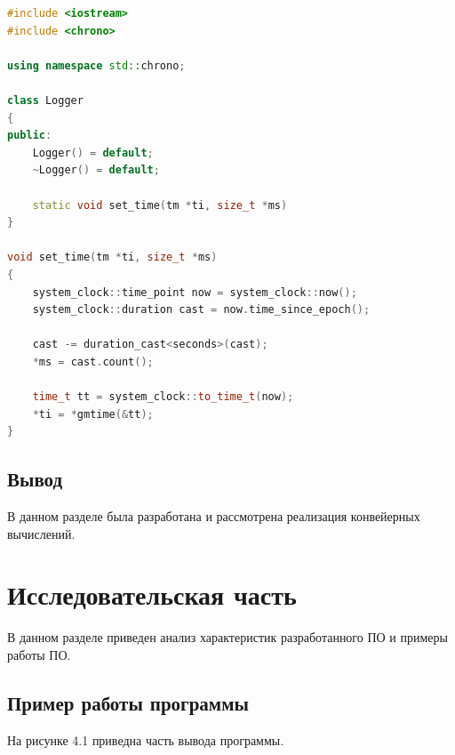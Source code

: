 \documentclass[12pt]{report}
\begin{document}
\begin{lstlisting}[label=some-code,caption=Реализация класса логирования, language=C++]
#include <iostream>
#include <chrono>

using namespace std::chrono;

class Logger 
{
public:
	Logger() = default;
	~Logger() = default;
	
	static void set_time(tm *ti, size_t *ms)
}

void set_time(tm *ti, size_t *ms)
{
    system_clock::time_point now = system_clock::now();
    system_clock::duration cast = now.time_since_epoch();

    cast -= duration_cast<seconds>(cast);
    *ms = cast.count();
    
    time_t tt = system_clock::to_time_t(now);
    *ti = *gmtime(&tt);
}
\end{lstlisting}


\section*{Вывод}

В данном разделе была разработана и рассмотрена реализация конвейерных вычислений.

\chapter{Исследовательская часть}

В данном разделе приведен анализ характеристик разработанного ПО  и примеры работы ПО.

\section{Пример работы программы}

На рисунке 4.1 приведна часть вывода программы.
\end{document}
